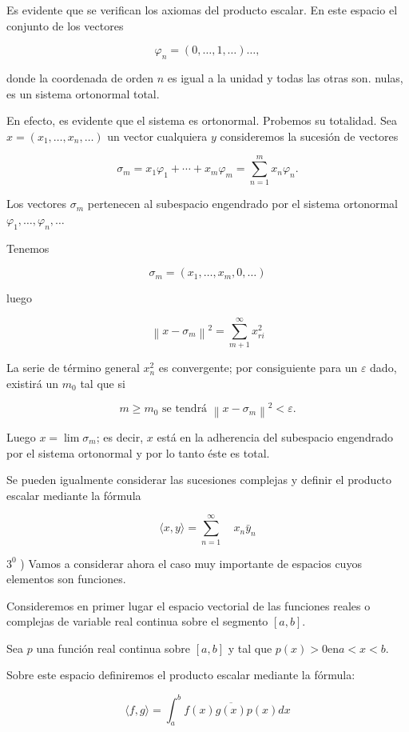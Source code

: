 \documentclass[10pt]{article}
\theoremstyle{plain}
\theoremstyle{definition}
\theoremstyle{remark}
\begin{document}
Es evidente que se verifican los axiomas del producto escalar. En este espacio el conjunto de los vectores

$$
\varphi_{n}=(0, \ldots, 1, \ldots) \ldots,
$$

donde la coordenada de orden $n$ es igual a la unidad y todas las otras son. nulas, es un sistema ortonormal total.

En efecto, es evidente que el sistema es ortonormal. Probemos su totalidad. Sea $x=\left(x_{1}, \ldots, x_{n}, \ldots\right)$ un vector cualquiera $y$ consideremos la sucesión de vectores

$$
\sigma_{m}=x_{1} \varphi_{1}+\cdots+x_{m} \varphi_{m}=\sum_{n=1}^{m} x_{n} \varphi_{n} .
$$

Los vectores $\sigma_{m}$ pertenecen al subespacio engendrado por el sistema ortonormal $\varphi_{1}, \ldots, \varphi_{n}, \ldots$

Tenemos

$$
\sigma_{m}=\left(x_{1}, \ldots, x_{m}, 0, \ldots\right)
$$

luego

$$
\left\|x-\sigma_{m}\right\|^{2}=\sum_{m+1}^{\infty} x_{r i}^{2}
$$

La serie de término general $x_{n}^{2}$ es convergente; por consiguiente para un $\varepsilon$ dado, existirá un $m_{0}$ tal que si

$$
m \geqslant m_{0} \text { se tendrá }\left\|x-\sigma_{m}\right\|^{2}<\varepsilon .
$$

Luego $x=\lim \sigma_{m}$; es decir, $x$ está en la adherencia del subespacio engendrado por el sistema ortonormal y por lo tanto éste es total.

Se pueden igualmente considerar las sucesiones complejas y definir el producto escalar mediante la fórmula

$$
\langle x, y\rangle=\sum_{n=1}^{\infty} \quad x_{n} \bar{y}_{n}
$$

$3^{0}$ ) Vamos a considerar ahora el caso muy importante de espacios cuyos elementos son funciones.


Consideremos en primer lugar el espacio vectorial de las funciones reales o complejas de variable real continua sobre el segmento $[a, b]$.

Sea $p$ una función real continua sobre $[a, b]$ y tal que $p(x)>0 \mathrm{en} a<x<b$.

Sobre este espacio definiremos el producto escalar mediante la fórmula:


\begin{equation*}
\langle f, g\rangle=\int_{a}^{b} f(x) \overline{g(x)} p(x) d x \tag{$3\cdot13$}
\end{equation*}
\end{document}
